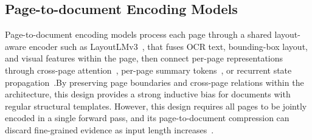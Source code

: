 \documentclass[11pt]{article}
\begin{document}

\subsection{Page-to-document Encoding Models}
\label{sec:arch-p2d}
Page-to-document encoding models process each page through a shared layout-aware encoder such as LayoutLMv3~\cite{huang2022layoutlmv3}, that fuses OCR text, bounding-box layout, and visual features within the page, then connect per-page representations through cross-page attention~\cite{borchmann2025arctic}, per-page summary tokens~\cite{tito2023hierarchical}, or recurrent state propagation~\cite{dong2024multi}.By preserving page boundaries and cross-page relations within the architecture, this design provides a strong inductive bias for documents with regular structural templates. 
However, this design requires all pages to be jointly encoded in a single forward pass, and its page-to-document compression can discard fine-grained evidence as input length increases~\cite{blau2024gram}.
\end{document}
